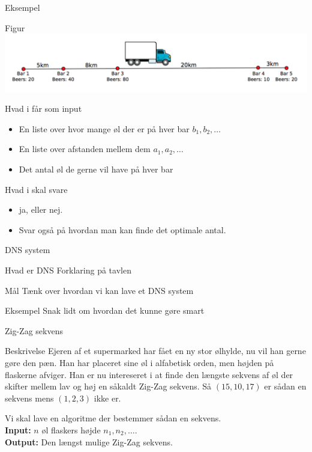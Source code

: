 \documentclass[12pt,t]{beamer}
\begin{document}
\begin{frame}[c]{Eksempel}
    \begin{block}{Figur}
      \includegraphics[scale=0.5]{fragt.png}
    \end{block}
    \pause
    \begin{block}{Hvad i får som input}
      \begin{itemize}
        \item En liste over hvor mange øl der er på hver bar $b_1, b_2, \dots$
        \item En liste over afstanden mellem dem $a_1, a_2, \dots$ \pause
        \item Det antal øl de gerne vil have på hver bar \pause
      \end{itemize}
    \end{block}

    \begin{block}{Hvad i skal svare}
      \begin{itemize}
        \item ja, eller nej. \pause
        \item Svar også på hvordan man kan finde det optimale antal.
      \end{itemize}
    \end{block}
\end{frame}

\begin{frame}{DNS system}
\begin{block}{Hvad er DNS}
    Forklaring på tavlen
\end{block}
  \begin{block}{Mål}
      Tænk over hvordan vi kan lave et DNS system
  \end{block}
  \pause
  \begin{exampleblock}{Eksempel}
      Snak lidt om hvordan det kunne gøre smart
  \end{exampleblock}
\end{frame}

\begin{frame}[plain]{Zig-Zag sekvens}
    \begin{block}{Beskrivelse}
      Ejeren af et supermarked har fået en ny stor ølhylde, nu vil han gerne
      gøre den pæn. Han har placeret sine øl i alfabetisk orden, men højden
      på flaskerne afviger. Han er nu intereseret i at finde den længste
      sekvens af øl der skifter mellem lav og høj en såkaldt Zig-Zag sekvens.
      Så $(15,10,17)$ er sådan en sekvens mens $(1,2,3)$ ikke er.

      Vi skal lave en algoritme der bestemmer sådan en sekvens.\\
      \textbf{Input:} $n$ øl flaskers højde $n_1, n_2, \dots$. \\
      \textbf{Output:} Den længst mulige Zig-Zag sekvens.
    \end{block}
\end{frame}
\end{document}
